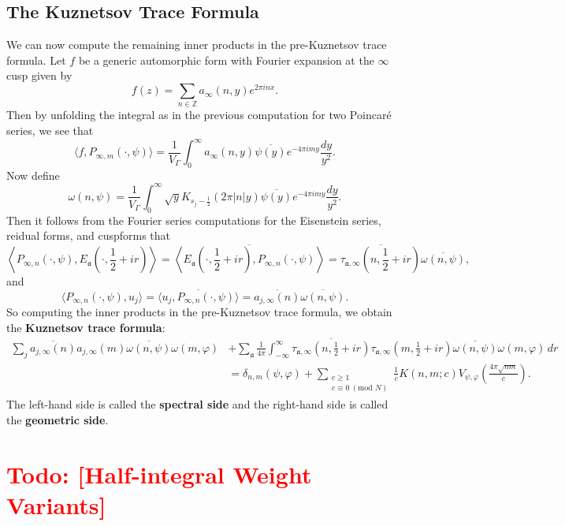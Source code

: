 \documentclass[12pt]{book}
\theoremstyle{definition}\newframedtheorem{method}{Method}
\newcommand{\tmod}[1]{\ \left(\text{mod }#1\right)}
\newcommand{\mf}{\mathfrak}
\newcommand{\Z}{\mathbb{Z}}
\renewcommand{\d}{\delta}
\newcommand{\w}{\omega}
\newcommand{\G}{\Gamma}
\newcommand{\vphi}{\varphi}
\newcommand{\<}{\langle}
\renewcommand{\>}{\rangle}
\newcommand{\conj}{\overline}
\newcommand{\todo}[1]{\textcolor{red}{\sf Todo: [#1]}}
\begin{document}
    \subsection*{The Kuznetsov Trace Formula}
      We can now compute the remaining inner products in the pre-Kuznetsov trace formula. Let $f$ be a generic automorphic form with Fourier expansion at the $\infty$ cusp given by
      \[
        f(z) = \sum_{n \in \Z}a_{\infty}(n,y)e^{2\pi inx}.
      \]
      Then by unfolding the integral as in the previous computation for two Poincar\'e series, we see that
      \[
        \<f,P_{\infty,m}(\cdot,\psi)\> = \frac{1}{V_{\G}}\int_{0}^{\infty}a_{\infty}(n,y)\conj{\psi(y)}e^{-4\pi imy}\frac{dy}{y^{2}}.
      \]
      Now define
      \[
        \w(n,\psi) = \frac{1}{V_{\G}}\int_{0}^{\infty}\sqrt{y}K_{s_{j}-\frac{1}{2}}(2\pi|n|y)\conj{\psi(y)}e^{-4\pi imy}\frac{dy}{y^{2}}.
      \]
      Then it follows from the Fourier series computations for the Eisenstein series, reidual forms, and cuspforms that
      \[
        \left\<P_{\infty,n}(\cdot,\psi),E_{\mf{a}}\left(\cdot,\frac{1}{2}+ir\right)\right\> = \conj{\left\<E_{\mf{a}}\left(\cdot,\frac{1}{2}+ir\right),P_{\infty,n}(\cdot,\psi)\right\>} = \conj{\tau_{\mf{a},\infty}\left(n,\frac{1}{2}+ir\right)}\conj{\w(n,\psi)},
      \]
      and
      \[
        \<P_{\infty,n}(\cdot,\psi),u_{j}\> = \conj{\<u_{j},P_{\infty,n}(\cdot,\psi)\>} = \conj{a_{j,\infty}(n)}\conj{\w(n,\psi)}.
      \]
      So computing the inner products in the pre-Kuznetsov trace formula, we obtain the \textbf{Kuznetsov trace formula}:
      \begin{align*}
        \sum_{j}\conj{a_{j,\infty}(n)}a_{j,\infty}(m)\conj{\w(n,\psi)}\w(m,\vphi)&+\sum_{\mf{a}}\frac{1}{4\pi}\int_{-\infty}^{\infty}\conj{\tau_{\mf{a},\infty}\left(n,\frac{1}{2}+ir\right)}\tau_{\mf{a},\infty}\left(m,\frac{1}{2}+ir\right)\conj{\w(n,\psi)}\w(m,\vphi)\,dr \\
        &= \d_{n,m}(\psi,\vphi)+\sum_{\substack{c \ge 1 \\ c \equiv 0 \tmod{N}}}\frac{1}{c}K(n,m;c)V_{\psi,\vphi}\left(\frac{4\pi\sqrt{nm}}{c}\right).
      \end{align*}
      The left-hand side is called the \textbf{spectral side} and the right-hand side is called the \textbf{geometric side}.
  \section{\todo{Half-integral Weight Variants}}
\end{document}
